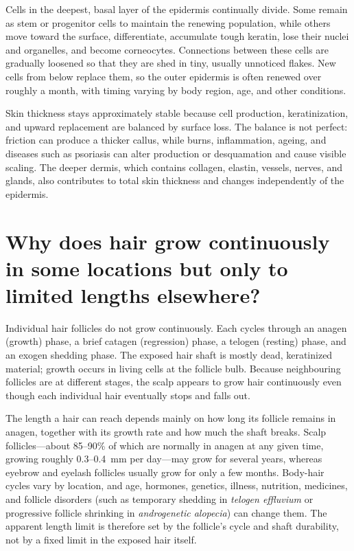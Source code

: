 \documentclass[11pt,oneside]{report}
\begin{document}
Cells in the deepest, basal layer of the epidermis continually divide. Some
remain as stem or progenitor cells to maintain the renewing population, while
others move toward the surface, differentiate, accumulate tough keratin, lose
their nuclei and organelles, and become corneocytes. Connections between these
cells are gradually loosened so that they are shed in tiny, usually unnoticed
flakes. New cells from below replace them, so the outer epidermis is often
renewed over roughly a month, with timing varying by body region, age, and
other conditions.

Skin thickness stays approximately stable because cell production,
keratinization, and upward replacement are balanced by surface loss. The
balance is not perfect: friction can produce a thicker callus, while burns,
inflammation, ageing, and diseases such as psoriasis can alter production or
desquamation and cause visible scaling. The deeper dermis, which contains
collagen, elastin, vessels, nerves, and glands, also contributes to total skin
thickness and changes independently of the epidermis.

\section{Why does hair grow continuously in some locations but only to limited lengths elsewhere?}

Individual hair follicles do not grow continuously. Each cycles through an
anagen (growth) phase, a brief catagen (regression) phase, a telogen (resting)
phase, and an exogen shedding phase. The exposed hair shaft is mostly dead,
keratinized material; growth occurs in living cells at the follicle bulb.
Because neighbouring follicles are at different stages, the scalp appears to
grow hair continuously even though each individual hair eventually stops and
falls out.

The length a hair can reach depends mainly on how long its follicle remains in
anagen, together with its growth rate and how much the shaft breaks. Scalp
follicles—about 85--90\% of which are normally in anagen at any given time,
growing roughly 0.3--0.4~mm per day—may grow for several years, whereas eyebrow
and eyelash follicles usually grow for only a few months. Body-hair cycles vary
by location, and age, hormones, genetics, illness, nutrition, medicines, and
follicle disorders (such as temporary shedding in \emph{telogen effluvium} or
progressive follicle shrinking in \emph{androgenetic alopecia}) can change them. The apparent length limit is therefore set by the follicle's
cycle and shaft durability, not by a fixed limit in the exposed hair itself.
\end{document}
